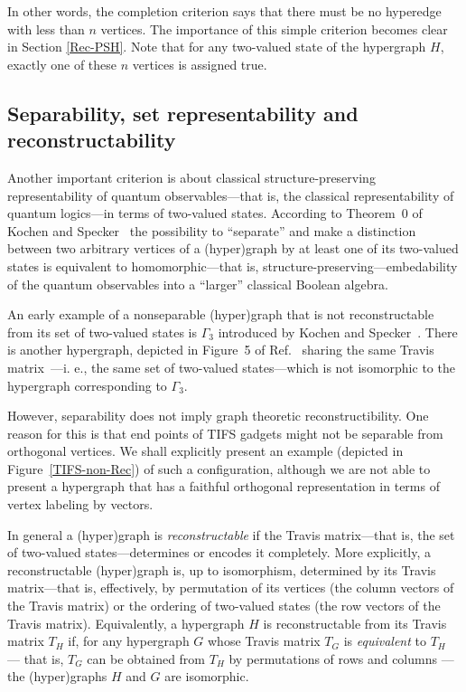 \documentclass[%
12pt,
prereprint,
showpacs,
showkeys,
preprintnumbers,
amsmath,amssymb,
aps,
pra,
longbibliography,
notitlepage
]{revtex4-1}
\theoremstyle{definition}
\begin{document}
	In other words, the completion criterion says that there must be no hyperedge with less than $n$ vertices. The importance of this simple criterion becomes clear in Section \ref{Rec-PSH}. Note that for any two-valued state of the hypergraph $H$, exactly one of these $n$ vertices is assigned true.
	
	\subsection{Separability, set representability and reconstructability}
	
	Another important criterion is about classical structure-preserving representability of quantum observables---that is, the classical representability of quantum logics---in terms of two-valued states. According to Theorem~0 of Kochen and Specker~\cite[p.~67]{kochen1}
	the possibility to ``separate'' and make a distinction between two arbitrary vertices of a (hyper)graph by at least one of its two-valued states is equivalent to homomorphic---that is, structure-preserving---embedability of the quantum observables into a ``larger'' classical Boolean algebra.
	
	An early example of a nonseparable (hyper)graph that is not reconstructable from its set of two-valued states is  $\Gamma_3$ introduced by Kochen and Specker~\cite[p.~70]{kochen1}.
	There is another hypergraph, depicted in Figure~5 of Ref.~\cite{svozil-2017-b} sharing the same Travis~\cite{travis-mt-62} matrix~\cite{greechie-66-PhD}---i. e., the same set of two-valued states---which is not isomorphic to the hypergraph corresponding to $\Gamma_3$.
	
	However, separability does not imply graph theoretic reconstructibility. One reason for this is that end points of TIFS gadgets might not be separable from orthogonal vertices. We shall explicitly present an example (depicted in Figure~\ref{TIFS-non-Rec}) of such a configuration, although we are not able to present a hypergraph that has a faithful orthogonal representation in terms of vertex labeling by vectors.
	
	In general a (hyper)graph is \emph{reconstructable} if the Travis matrix---that is, the set of two-valued states---determines or encodes it completely.
	More explicitly, a reconstructable (hyper)graph is, up to isomorphism,  determined by its Travis matrix---that is, effectively, by permutation of its vertices (the column vectors of the Travis matrix) or the ordering of two-valued states (the row vectors of the Travis matrix). Equivalently, a hypergraph $H$ is reconstructable from its Travis matrix $T_H$ if, for any hypergraph $G$ whose Travis matrix $T_G$ is \emph{equivalent} to $T_H$ --- that is, $T_G$ can be obtained from $T_H$ by permutations of rows and columns --- the (hyper)graphs $H$ and $G$ are isomorphic.
	
\end{document}
